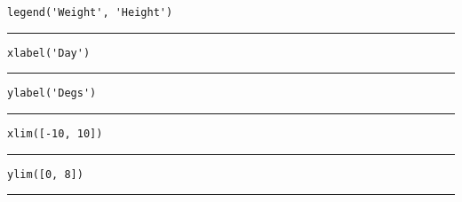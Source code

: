 \documentclass[spanish, 10pt]{article}
\newcommand{\responserule}{{\large\rule{14 cm}{0.3mm}}}
\newcommand{\matlab}[1]{\lstinline[style=Matlab-pyglike]!#1!}
\begin{document}
\matlab{legend('Weight', 'Height')} \hfill \\[1.25ex]
\responserule

\bigskip

\matlab{xlabel('Day')} \hfill \\[1.25ex]
\responserule

\bigskip

\matlab{ylabel('Degs')} \hfill \\[1.25ex]
\responserule

\bigskip

\matlab{xlim([-10, 10])} \hfill \\[1.25ex]
\responserule
\bigskip

\matlab{ylim([0, 8])} \hfill \\[1.25ex]
\responserule


\end{document}
